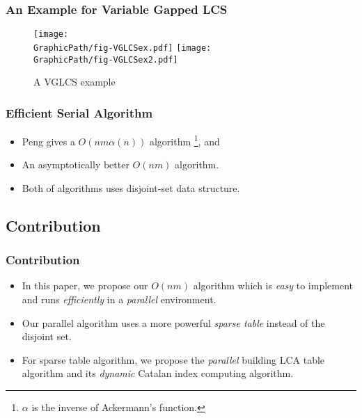 \begin{frame}
    \frametitle{An Example for Variable Gapped LCS}
    \begin{figure}[!thb]
      \centering
      \texttt{[image: \\GraphicPath/fig-VGLCSex.pdf]}
      \texttt{[image: \\GraphicPath/fig-VGLCSex2.pdf]}
      \caption{A VGLCS example} \label{fig:VGLCSex}
    \end{figure}
\end{frame}

\begin{frame}
    \frametitle{Efficient Serial Algorithm}
    \begin{itemize}
        \setlength\itemsep{1em}
        \item 
            Peng gives a $O(n m \alpha(n))$ algorithm \footnote{$\alpha$
            is the inverse of Ackermann's function.}, and
        \item
            An asymptotically better $O(n m)$ algorithm.
        \item 
            Both of algorithms uses disjoint-set data structure.
    \end{itemize}
\end{frame}

\subsection{Contribution}
\begin{frame}
    \frametitle{Contribution}
    \begin{itemize}
        \setlength\itemsep{1em}
        \item
            In this paper, we propose our $O(nm)$ algorithm which is {\em
            easy} to implement and runs {\em efficiently} in a {\em
            parallel} environment.
        \item
            Our parallel algorithm uses a more powerful {\em sparse table}
            instead of the disjoint set.
        \item
            For sparse table algorithm, we propose the {\em parallel}
            building LCA table algorithm and its {\em dynamic} Catalan
            index computing algorithm.
    \end{itemize}
\end{frame}
